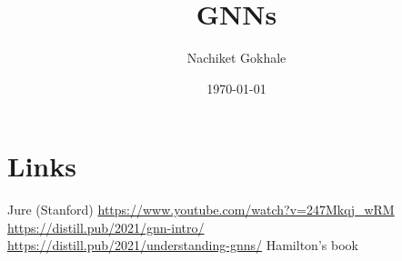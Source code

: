 \documentclass{article}
\begin{document}
\title{GNNs}
\author{Nachiket Gokhale}
\date{\today}
\maketitle
\section{Links}
Jure (Stanford) \url{https://www.youtube.com/watch?v=247Mkqj_wRM}\\
\url{https://distill.pub/2021/gnn-intro/}\\
\url{https://distill.pub/2021/understanding-gnns/}
Hamilton's book
\end{document}
